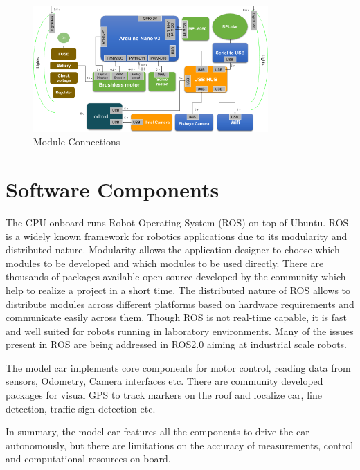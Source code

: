 \begin{figure}
	\centering
	\includegraphics[width=0.8\textwidth]{Images/platform/hardware_Connections.png}
	\caption{Module Connections \cite{model_car_archi}}
	\label{moduleconnections}
\end{figure}

\section{Software Components}
The CPU onboard runs Robot Operating System (ROS) on top of Ubuntu. ROS is a widely known framework for robotics applications due to its modularity and distributed nature. Modularity allows the application designer to choose which modules to be developed and which modules to be used directly. There are thousands of packages available open-source developed by the community which help to realize a project in a short time. The distributed nature of ROS allows to distribute modules across different platforms based on hardware requirements and communicate easily across them. Though ROS is not real-time capable, it is fast and well suited for robots running in laboratory environments. Many of the issues present in ROS are being addressed in ROS2.0 aiming at industrial scale robots. 

The model car implements core components for motor control, reading data from sensors, Odometry, Camera interfaces etc. There are community developed packages for visual GPS to track markers on the roof and localize car, line detection, traffic sign detection etc.

In summary, the model car features all the components to drive the car autonomously, but there are limitations on the accuracy of measurements, control and computational resources on board. 

